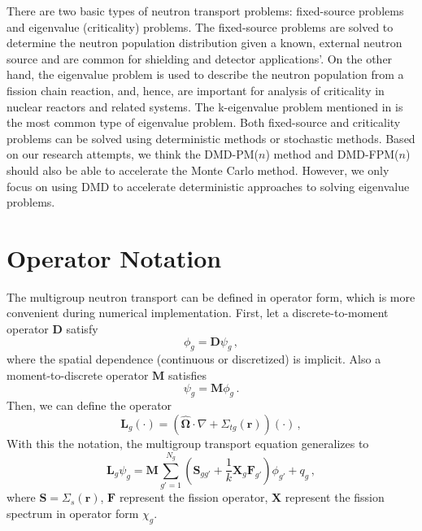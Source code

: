 There are two basic types of neutron transport problems: fixed-source problems and eigenvalue (criticality) problems.  
The fixed-source problems are solved to determine the neutron population distribution given a known, external neutron source and are common for shielding and detector applications'.
On the other hand, the eigenvalue problem is used to describe the neutron population from a fission chain reaction, and, hence, are important for analysis of criticality in nuclear reactors and related systems.
The k-eigenvalue problem mentioned in  is the most common type of eigenvalue problem.
Both fixed-source and criticality problems can be solved using deterministic methods or stochastic methods.
Based on our research attempts, we think the DMD-PM($n$) method and DMD-FPM($n$) should also be able to accelerate the Monte Carlo method. 
However, we only focus on using DMD to accelerate deterministic approaches to solving eigenvalue problems.

\section{Operator Notation}
The multigroup neutron transport  can be defined in operator form, which is more convenient during numerical implementation. 
First, let a discrete-to-moment operator $\mathbf{D}$ satisfy
\begin{equation}
 \phi_g = \mathbf{D} \psi_g  \, ,
 \label{eq:operatorD}
\end{equation}
where the spatial dependence (continuous or discretized) is implicit. Also a moment-to-discrete operator $\mathbf{M}$ satisfies
\begin{equation}
 \psi_g = \mathbf{M} \phi_g  \, .
 \label{eq:operatorM}
\end{equation}
Then, we can define the operator 
\begin{equation}
 \mathbf{L}_g(\cdot) = (\bm{\hat{\Omega}} \cdot \nabla + \Sigma_{tg}(\mathbf{r}))(\cdot) \, ,
 \label{eq:operatorL}
\end{equation}
With this the notation, the multigroup transport equation generalizes to \cite{slaybaugh_multigrid_2013}
\begin{equation}
\mathbf{L}_g \psi_g = \mathbf{M} \sum\limits^{N_g}_{g'=1} (\mathbf{S}_{gg'} + \frac{1}{k} \mathbf{X}_g \mathbf{F}_{g'}) \phi_{g'} +q_g   \, ,
 \label{eq:operator_transport}
\end{equation}
where $\mathbf{S} = \Sigma_s(\mathbf{r})$, $\mathbf{F}$ represent the fission operator, $\mathbf{X}$ represent the fission spectrum in operator form $\chi_g$. 

